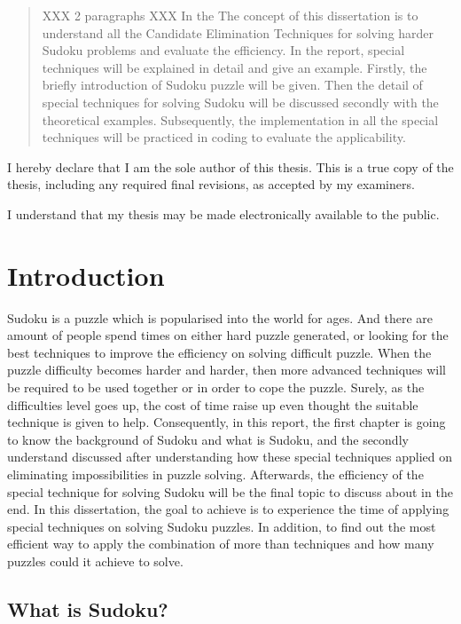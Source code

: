 \documentclass[11pt]{report}
\begin{document}
\begin{abstract}
  XXX 2 paragraphs XXX
In the The concept of this dissertation is to understand all the Candidate Elimination Techniques for solving harder Sudoku problems and evaluate the efficiency. In the report, special techniques will be explained in detail and give an example.
Firstly, the briefly introduction of Sudoku puzzle will be given. Then the detail of special techniques for solving Sudoku will be discussed secondly with the theoretical examples.
Subsequently, the implementation in all the special techniques will be practiced in coding to evaluate the applicability.
\end{abstract}

I hereby declare that I am the sole author of this thesis. This is a true copy of the thesis, including any required final revisions, as accepted by my examiners.

I understand that my thesis may be made electronically available to the public.
\tableofcontents



\chapter{Introduction}
\label{cha:Introduction}


Sudoku is a puzzle which is popularised into the world for ages. And there are amount of people spend times on either hard puzzle generated, or looking for the best techniques to improve the efficiency on solving difficult puzzle.
When the puzzle difficulty becomes harder and harder, then more advanced techniques will be required to be used together or in order to cope the puzzle. Surely, as the difficulties level goes up, the cost of time raise up even thought the suitable technique is given to help. Consequently, in this report, the first chapter is going to know the background of Sudoku and what is Sudoku, and the secondly understand discussed after understanding how these special techniques applied on eliminating impossibilities in puzzle solving. Afterwards, the efficiency of the special technique for solving Sudoku will be the final topic to discuss about in the end.
In this dissertation, the goal to achieve is to experience the time of applying special techniques on solving Sudoku puzzles. In addition, to find out the most efficient way to apply the combination of more than techniques and how many puzzles could it achieve to solve.


\section{What is Sudoku?}
\label{sec:whatissudoku}
\end{document}
